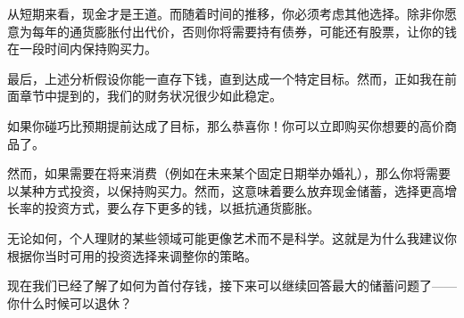 从短期来看，现金才是王道。而随着时间的推移，你必须考虑其他选择。除非你愿意为每年的通货膨胀付出代价，否则你将需要持有债券，可能还有股票，让你的钱在一段时间内保持购买力。

最后，上述分析假设你能一直存下钱，直到达成一个特定目标。然而，正如我在前面章节中提到的，我们的财务状况很少如此稳定。

如果你碰巧比预期提前达成了目标，那么恭喜你！你可以立即购买你想要的高价商品了。

然而，如果需要在将来消费（例如在未来某个固定日期举办婚礼），那么你将需要以某种方式投资，以保持购买力。然而，这意味着要么放弃现金储蓄，选择更高增长率的投资方式，要么存下更多的钱，以抵抗通货膨胀。

无论如何，个人理财的某些领域可能更像艺术而不是科学。这就是为什么我建议你根据你当时可用的投资选择来调整你的策略。

现在我们已经了解了如何为首付存钱，接下来可以继续回答最大的储蓄问题了——你什么时候可以退休？

